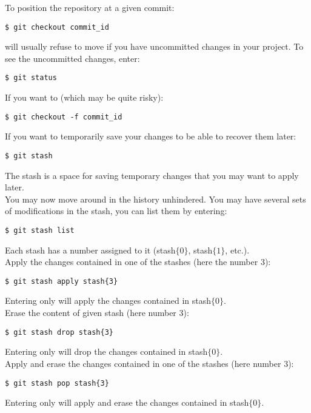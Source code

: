 To position the repository at a given commit:
\begin{lstlisting}
$ git checkout commit_id
\end{lstlisting}

 will usually refuse to move if you have uncommitted changes in your
project. To see the uncommitted changes, enter:
\begin{lstlisting}
$ git status
\end{lstlisting}

If you want to  (which may be
quite risky):
\begin{lstlisting}
$ git checkout -f commit_id
\end{lstlisting}

If you want to temporarily save your changes to be able to recover them later:
\begin{lstlisting}
$ git stash
\end{lstlisting}

The stash is a space for saving temporary changes that you may want to apply
later.\\

You may now move around in the history unhindered. You may have several sets of
modifications in the stash, you can list them by entering:
\begin{lstlisting}
$ git stash list
\end{lstlisting}
Each stash has a number assigned to it (stash$\{0\}$, stash$\{1\}$, etc.).\\

Apply the changes contained in one of the stashes (here the number 3):
\begin{lstlisting}
$ git stash apply stash{3}
\end{lstlisting}
Entering only  will apply the changes contained in
stash$\{0\}$.\\

Erase the content of given stash (here number 3):
\begin{lstlisting}
$ git stash drop stash{3}
\end{lstlisting}
Entering only  will drop the changes contained in
stash$\{0\}$.\\

Apply and erase the changes contained in one of the stashes (here number 3):
\begin{lstlisting}
$ git stash pop stash{3}
\end{lstlisting}
Entering only  will apply and erase the changes
contained in stash$\{0\}$.

